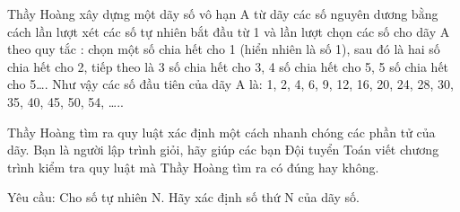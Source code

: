 Thầy Hoàng xây dựng một dãy số vô hạn A từ dãy các số nguyên dương bằng cách lần lượt xét các số tự nhiên bắt đầu từ 1 và lần lượt chọn các số cho dãy A theo quy tắc : chọn một số chia hết cho 1 (hiển nhiên là số 1),  sau đó là hai số chia hết cho 2, tiếp theo là 3 số chia hết cho 3, 4 số chia hết cho 5, 5 số chia hết cho 5…. Như vậy các số đầu tiên của dãy A là: 1, 2, 4, 6, 9, 12, 16, 20, 24, 28, 30, 35, 40, 45, 50, 54, …..  

   Thầy Hoàng tìm ra quy luật xác định một cách nhanh chóng các phần tử của dãy. Bạn là người lập trình giỏi, hãy giúp các bạn Đội tuyển Toán viết chương trình kiểm tra quy luật mà Thầy Hoàng tìm ra có đúng hay không.  

   Yêu cầu: Cho số tự nhiên N. Hãy xác định số thứ N của dãy số.